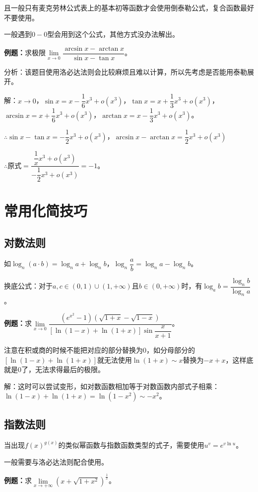 且一般只有麦克劳林公式表上的基本初等函数才会使用倒泰勒公式，复合函数最好不要使用。

一般遇到$0-0$型会用到这个公式，其他方式没办法解出。

\textbf{例题：}求极限$\lim\limits_{x\to 0}\dfrac{\arcsin x-\arctan x}{\sin x-\tan x}$。\medskip

分析：该题目使用洛必达法则会比较麻烦且难以计算，所以先考虑是否能用泰勒展开。

解：$x\to 0$，$\sin x=x-\dfrac{1}{6}x^3+o(x^3)$，$\tan x=x+\dfrac{1}{3}x^3+o(x^3)$，$\arcsin x=x+\dfrac{1}{6}x^3+o(x^3)$，$\arctan x=x-\dfrac{1}{3}x^3+o(x^3)$。

$\therefore \sin x-\tan x=-\dfrac{1}{2}x^3+o(x^3)$，$\arcsin x-\arctan x=\dfrac{1}{2}x^3+o(x^3)$

$\therefore \text{原式}=\dfrac{\dfrac{1}{x}x^3+o(x^3)}{-\dfrac{1}{2}x^3+o(x^3)}=-1$。

\section{常用化简技巧}

\subsection{对数法则}

如$\log_n(a\cdot b)=\log_n a+\log_n b$，$\log_n\dfrac{a}{b}=\log_na-\log_nb$。

换底公式：对于$a,c\in(0,1)\cup(1,+\infty)$且$b\in(0,+\infty)$时，有$\log_ab=\dfrac{\log_nb}{\log_na}$。

\textbf{例题：}求$\lim\limits_{x\to 0}\dfrac{(e^{x^2}-1)(\sqrt{1+x}-\sqrt{1-x})}{[\ln(1-x)+\ln(1+x)]\sin\dfrac{x}{x+1}}$。

注意在积或商的时候不能把对应的部分替换为0，如分母部分的$[\ln(1-x)+\ln(1+x)]$就无法使用$\ln(1+x)\sim x$替换为$-x+x$，这样底就是0了，无法求得最后的极限。

解：这时可以尝试变形，如对数函数相加等于对数函数内部式子相乘：$\ln(1-x)+\ln(1+x)=\ln(1-x^2)\sim-x^2$。

\subsection{指数法则}

当出现$f(x)^{g(x)}$的类似幂函数与指数函数类型的式子，需要使用$u^v=e^{v\ln u}$。

一般需要与洛必达法则配合使用。

\textbf{例题：}求$\lim\limits_{x\to+\infty}(x+\sqrt{1+x^2})^{\frac{1}{x}}$。

